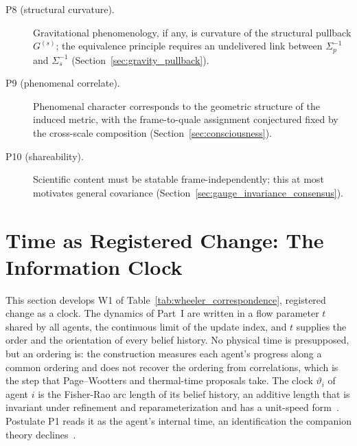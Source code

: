 \begin{description}
\item[P8 (structural curvature).] Gravitational phenomenology, if any, is curvature of the structural pullback $G^{(s)}$; the equivalence principle requires an undelivered link between $\Sigma_p^{-1}$ and $\Sigma_s^{-1}$ (Section~\ref{sec:gravity_pullback}).
\item[P9 (phenomenal correlate).] Phenomenal character corresponds to the geometric structure of the induced metric, with the frame-to-quale assignment conjectured fixed by the cross-scale composition (Section~\ref{sec:consciousness}).
\item[P10 (shareability).] Scientific content must be statable frame-independently; this at most motivates general covariance (Section~\ref{sec:gauge_invariance_consensus}).
\end{description}

\section{Time as Registered Change: The Information Clock}\label{sec:time_info}

This section develops W1 of Table~\ref{tab:wheeler_correspondence}, registered change as a clock. The dynamics of Part~I are written in a flow parameter $t$ shared by all agents, the continuous limit of the update index, and $t$ supplies the order and the orientation of every belief history. No physical time is presupposed, but an ordering is: the construction measures each agent's progress along a common ordering and does not recover the ordering from correlations, which is the step that Page--Wootters and thermal-time proposals take. The clock $\vartheta_i$ of agent $i$ is the Fisher-Rao arc length of its belief history, an additive length that is invariant under refinement and reparameterization and has a unit-speed form~\cite[Ch.~7]{DennisGaugeVFE2026}. Postulate P1 reads it as the agent's internal time, an identification the companion theory declines~\cite[Ch.~1]{DennisGaugeVFE2026}.

